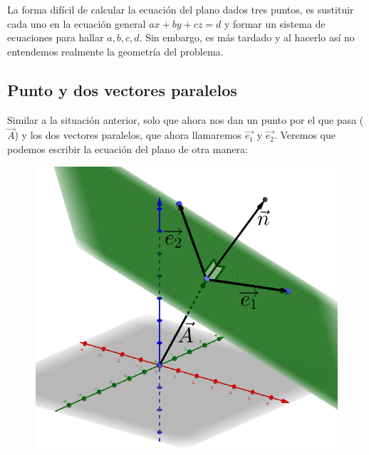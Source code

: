 \documentclass[12pt, fleqn]{report}                             %
\theoremstyle{break}                                            %
\newcommand{\lVec}[1]{\overrightarrow{#1}}                      %
\begin{document}
            La forma difícil de calcular la ecuación del plano dados tres puntos, es sustituir cada uno en la ecuación general $ax+by+cz=d$ y formar un sistema de ecuaciones para hallar $a,b,c,d$. Sin embargo, es más tardado y al hacerlo así no entendemos realmente la geometría del problema.
            
            
            \subsection{Punto y dos vectores paralelos}
            
            Similar a la situación anterior, solo que ahora nos dan un punto por el que pasa ($\vec{A}$) y los dos vectores paralelos, que ahora llamaremos $\lVec{e_1}$ y $\lVec{e_2}$. Veremos que podemos escribir la ecuación del plano de otra manera:
            
            \begin{figure}[H]
                \centering
                \includegraphics[scale=0.65]{plane3.png}
            \end{figure}
        
\end{document}
